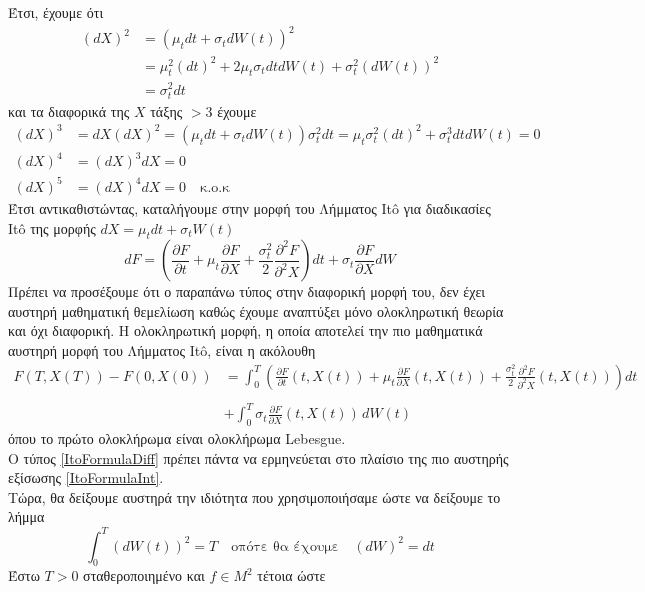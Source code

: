\documentclass[12pt,a4paper,twoside,openany]{book}
\begin{document}
	Έτσι, έχουμε ότι 
	\begin{align*}
		(dX)^2 &= (\mu_t dt +\sigma_t dW(t))^2 \\
			   &= \mu_t^2 (dt)^2+2\mu_t\sigma_t dt dW(t)+ \sigma_t^2(dW(t))^2 \\ 
			   &= \sigma_t^2 dt
	\end{align*}
	και τα διαφορικά της $X$ τάξης $>3$ έχουμε
	\begin{align*}
		(dX)^3 &= dX(dX)^2 = (\mu_t dt +\sigma_t dW(t))\sigma_t^2 dt = \mu_t\sigma_t^2 (dt)^2+ \sigma_t^3dtdW(t)= 0 \\
		(dX)^4 &= (dX)^3dX = 0 \\
		(dX)^5 &= (dX)^4dX = 0 \quad \text{κ.ο.κ}
	\end{align*}
	Έτσι αντικαθιστώντας, καταλήγουμε στην μορφή του Λήμματος Itô για διαδικασίες Itô της μορφής $dX=\mu_t dt +\sigma_t W(t)$ 
	\[dF= \left(\frac{\partial F}{\partial t} +\mu_t\frac{\partial F}{\partial X} + \frac{\sigma_t^2}{2}\frac{\partial^2 F}{\partial^2 X} \right)dt
	 + \sigma_t\frac{\partial F}{\partial X}dW  \label{ItoFormulaDiff}\tag{2.3.2}\]
	Πρέπει να προσέξουμε ότι ο παραπάνω τύπος στην διαφορική μορφή του, δεν έχει αυστηρή μαθηματική θεμελίωση καθώς έχουμε αναπτύξει μόνο ολοκληρωτική θεωρία και όχι διαφορική. Η ολοκληρωτική μορφή, η οποία αποτελεί την πιο μαθηματικά αυστηρή μορφή του Λήμματος Itô, είναι η ακόλουθη
	\begin{align*}
		F(T,X(T))- F(0,X(0)) &= \int_{0}^{T}\left(\frac{\partial F}{\partial t} (t,X(t)) + \mu_t\frac{\partial F}{\partial X} (t,X(t)) + \frac{\sigma_t^2}{2}\frac{\partial^2 F}{\partial^2 X}(t,X(t)) \right)dt 
		\\\\ &+ \int_{0}^{T}\sigma_t\frac{\partial F}{\partial X}(t,X(t))\, dW(t) \label{ItoFormulaInt}\tag{2.3.3}
	\end{align*}
	όπου το πρώτο ολοκλήρωμα είναι ολοκλήρωμα Lebesgue.\\
	Ο τύπος \eqref{ItoFormulaDiff} πρέπει πάντα να ερμηνεύεται στο πλαίσιο της πιο αυστηρής εξίσωσης \eqref{ItoFormulaInt}.
	\vspace{2.5mm}\\
	Tώρα, θα δείξουμε αυστηρά την ιδιότητα που χρησιμοποιήσαμε ώστε να δείξουμε το λήμμα
	\[\int_{0}^{T}(dW(t))^2=T\quad \text{οπότε θα έχουμε} \quad(dW)^2=dt\]
	Έστω $T>0$ σταθεροποιημένο και $f\in M^2$ τέτοια ώστε 
\end{document}
